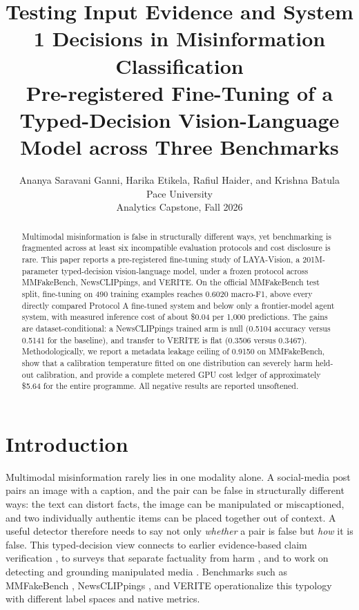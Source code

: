 \documentclass{article} %
\title{Testing Input Evidence and System 1 Decisions in Misinformation Classification\\[2pt] \large Pre-registered Fine-Tuning of a Typed-Decision Vision-Language Model across Three Benchmarks}
\author{Ananya Saravani Ganni, Harika Etikela, Rafiul Haider, and Krishna Batula\\
Pace University\\
Analytics Capstone, Fall 2026
}
\begin{document}
\maketitle

\begin{abstract}
Multimodal misinformation is false in structurally different ways, yet benchmarking is fragmented across at least six incompatible evaluation protocols and cost disclosure is rare. This paper reports a pre-registered fine-tuning study of LAYA-Vision, a 201M-parameter typed-decision vision-language model, under a frozen protocol across MMFakeBench, NewsCLIPpings, and VERITE. On the official MMFakeBench test split, fine-tuning on 490 training examples reaches 0.6020 macro-F1, above every directly compared Protocol A fine-tuned system and below only a frontier-model agent system, with measured inference cost of about \$0.04 per 1,000 predictions. The gains are dataset-conditional: a NewsCLIPpings trained arm is null (0.5104 accuracy versus 0.5141 for the baseline), and transfer to VERITE is flat (0.3506 versus 0.3467). Methodologically, we report a metadata leakage ceiling of 0.9150 on MMFakeBench, show that a calibration temperature fitted on one distribution can severely harm held-out calibration, and provide a complete metered GPU cost ledger of approximately \$5.64 for the entire programme. All negative results are reported unsoftened.
\end{abstract}

\section{Introduction}
\label{sec:intro}
Multimodal misinformation rarely lies in one modality alone. A social-media post pairs an image with a caption, and the pair can be false in structurally different ways: the text can distort facts, the image can be manipulated or miscaptioned, and two individually authentic items can be placed together out of context. A useful detector therefore needs to say not only \emph{whether} a pair is false but \emph{how} it is false. This typed-decision view connects to earlier evidence-based claim verification \citep{Thorne2018FeverLargescale, Augenstein2019MultifcRealworld, Guo2021SurveyAutomated}, to surveys that separate factuality from harm \citep{Alam2021SurveyMultimodal}, and to work on detecting and grounding manipulated media \citep{Shao2023DetectingGrounding}. Benchmarks such as MMFakeBench \citep{Liu2024MmfakebenchMixedsource}, NewsCLIPpings \citep{Luo2021NewsclippingsAutomatic}, and VERITE \citep{Papadopoulos2023VeriteRobust} operationalize this typology with different label spaces and native metrics.
\end{document}
